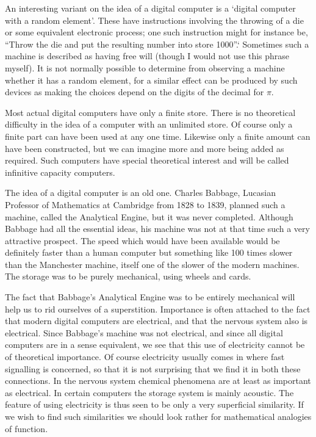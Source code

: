 \documentclass[10pt]{article} %
\begin{document}
An interesting variant on the idea of a digital computer is a `digital computer with a random element'. These have instructions involving the throwing of a die or some equivalent electronic process; one such instruction might for instance be, ``Throw the die and put the resulting number into store 1000''.` Sometimes such a machine is described as having free will (though I would not use this phrase myself). It is not normally possible to determine from observing a machine whether it has a random element, for a similar effect can be produced by such devices as making the choices depend on the digits of the decimal for $\pi$.

Most actual digital computers have only a finite store. There is no theoretical difficulty in the idea of a computer with an unlimited store. Of course only a finite part can have been used at any one time. Likewise only a finite amount can have been constructed, but we can imagine more and more being added as required. Such computers have special theoretical interest and will be called infinitive capacity computers.

The idea of a digital computer is an old one. Charles Babbage, Lucasian Professor of Mathematics at Cambridge from 1828 to 1839, planned such a machine, called the Analytical Engine, but it was never completed. Although Babbage had all the essential ideas, his machine was not at that time such a very attractive prospect. The speed which would have been available would be definitely faster than a human computer but something like 100 times slower than the Manchester machine, itself one of the slower of the modern machines. The storage was to be purely mechanical, using wheels and cards.

The fact that Babbage's Analytical Engine was to be entirely mechanical will help us to rid ourselves of a superstition. Importance is often attached to the fact that modern digital computers are electrical, and that the nervous system also is electrical. Since Babbage's machine was not electrical, and since all digital computers are in a sense equivalent, we see that this use of electricity cannot be of theoretical importance. Of course electricity usually comes in where fast signalling is concerned, so that it is not surprising that we find it in both these connections. In the nervous system chemical phenomena are at least as important as electrical. In certain computers the storage system is mainly acoustic. The feature of using electricity is thus seen to be only a very superficial similarity. If we wish to find such similarities we should look rather for mathematical analogies of function.
\end{document}
